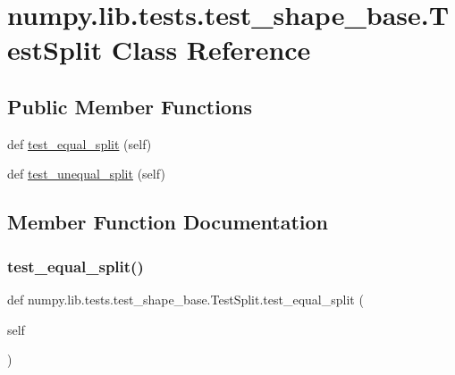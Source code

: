 \hypertarget{classnumpy_1_1lib_1_1tests_1_1test__shape__base_1_1TestSplit}{}\section{numpy.\+lib.\+tests.\+test\+\_\+shape\+\_\+base.\+Test\+Split Class Reference}
\label{classnumpy_1_1lib_1_1tests_1_1test__shape__base_1_1TestSplit}
\subsection*{Public Member Functions}
\begin{DoxyCompactItemize}
\item 
def \hyperlink{classnumpy_1_1lib_1_1tests_1_1test__shape__base_1_1TestSplit_a8667852dd2381fd205d15cbbe9a5d0f8}{test\+\_\+equal\+\_\+split} (self)
\item 
def \hyperlink{classnumpy_1_1lib_1_1tests_1_1test__shape__base_1_1TestSplit_a3712845474b73624a146513ec18208c2}{test\+\_\+unequal\+\_\+split} (self)
\end{DoxyCompactItemize}


\subsection{Member Function Documentation}
\mbox{\label{classnumpy_1_1lib_1_1tests_1_1test__shape__base_1_1TestSplit_a8667852dd2381fd205d15cbbe9a5d0f8}} 
\subsubsection{\texorpdfstring{test\+\_\+equal\+\_\+split()}{test\_equal\_split()}}
{\footnotesize\ttfamily def numpy.\+lib.\+tests.\+test\+\_\+shape\+\_\+base.\+Test\+Split.\+test\+\_\+equal\+\_\+split (\begin{DoxyParamCaption}\item[{}]{self }\end{DoxyParamCaption})}

